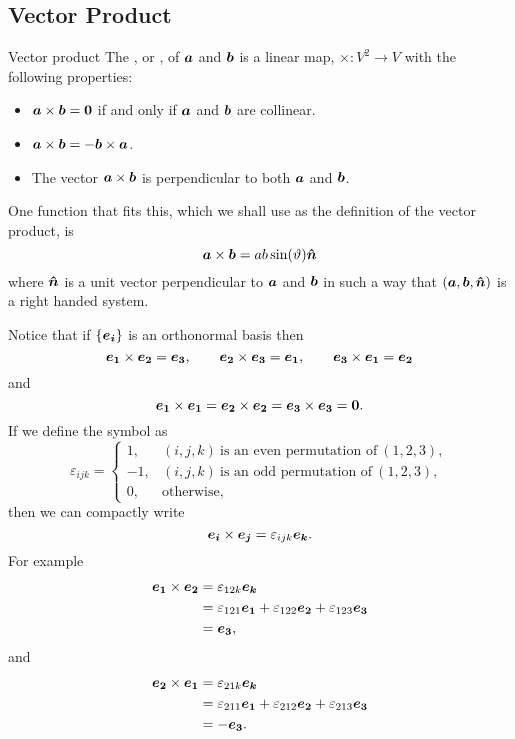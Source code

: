 \subsection{Vector Product}
\begin{definition}{Vector product}{}
    The , or , of \(\bm{a}\) and \(\bm{b}\) is a linear map, \(\times\colon V^2\to V\) with the following properties:
    \begin{itemize}
        \item \(\bm{a} \times \bm{b} = \bm{0}\) if and only if \(\bm{a}\) and \(\bm{b}\) are collinear.
        \item \(\bm{a} \times \bm{b} = - \bm{b} \times \bm{a}\).
        \item The vector \(\bm{a}\times\bm{b}\) is perpendicular to both \(\bm{a}\) and \(\bm{b}\).
    \end{itemize}
    One function that fits this, which we shall use as the definition of the vector product, is
    \[\bm{a}\times\bm{b} = ab\sin(\vartheta)\bm{\hat{n}}\]
    where \(\bm{\hat{n}}\) is a unit vector perpendicular to \(\bm{a}\) and \(\bm{b}\) in such a way that \((\bm{a}, \bm{b}, \bm{\hat{n}})\) is a right handed system.
\end{definition}
Notice that if \(\{\bm{e_{i}}\}\) is an orthonormal basis then
\[\bm{e_{1}}\times\bm{e_{2}} = \bm{e_{3}}, \qquad \bm{e_{2}}\times\bm{e_{3}} = \bm{e_{1}}, \qquad \bm{e_{3}}\times\bm{e_{1}} = \bm{e_{2}}\]
and
\[\bm{e_{1}}\times\bm{e_{1}} = \bm{e_{2}}\times\bm{e_{2}} = \bm{e_{3}}\times\bm{e_{3}} = \bm{0}.\]
If we define the  symbol as
\[
\varepsilon_{ijk} = 
\begin{cases}
    1, & (i, j, k)~\text{is an even permutation of}~(1, 2, 3),\\
    -1, & (i, j, k)~\text{is an odd permutation of}~(1, 2, 3),\\
    0, & \text{otherwise},
\end{cases}
\]
then we can compactly write
\[\bm{e_{i}}\times\bm{e_{j}} = \varepsilon_{ijk}\bm{e_{k}}.\]
For example
\begin{align*}
    \bm{e_{1}}\times\bm{e_{2}} &= \varepsilon_{12k}\bm{e_{k}}\\
    &= \varepsilon_{121}\bm{e_{1}} + \varepsilon_{122}\bm{e_{2}} + \varepsilon_{123}\bm{e_{3}}\\
    &= \bm{e_{3}},
\end{align*}
and
\begin{align*}
    \bm{e_{2}}\times\bm{e_{1}} &= \varepsilon_{21k}\bm{e_{k}}\\
    &= \varepsilon_{211}\bm{e_{1}} + \varepsilon_{212}\bm{e_{2}} + \varepsilon_{213}\bm{e_{3}}\\
    &= -\bm{e_{3}}.
\end{align*}
